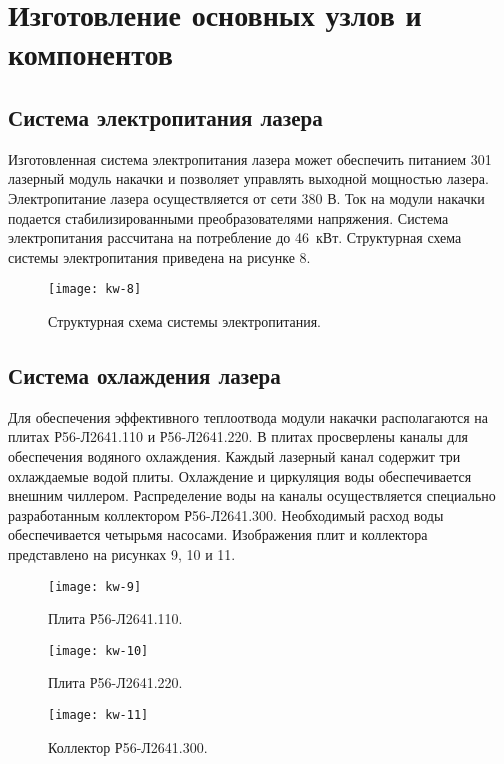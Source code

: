 \section{Изготовление основных узлов и компонентов}
\label{sec:kw-manufacturing}

\subsection{Система электропитания лазера}

Изготовленная система электропитания лазера может обеспечить питанием 301 лазерный модуль накачки и позволяет управлять выходной мощностью лазера. Электропитание лазера осуществляется от сети 380 В. Ток на модули накачки подается стабилизированными преобразователями напряжения. Система электропитания рассчитана на потребление до 46~кВт. Структурная схема системы электропитания приведена на рисунке 8.
\begin{figure}
  \centering
  \texttt{[image: kw-8]}
  \caption{Структурная схема системы электропитания.}
  \label{img:kw-8}
\end{figure}

\subsection{Система охлаждения лазера}

Для обеспечения эффективного теплоотвода модули накачки располагаются на плитах Р56-Л2641.110 и Р56-Л2641.220. В плитах просверлены каналы для обеспечения водяного охлаждения. Каждый лазерный канал содержит три охлаждаемые водой плиты. Охлаждение и циркуляция воды обеспечивается внешним чиллером. Распределение воды на каналы осуществляется специально разработанным коллектором Р56-Л2641.300. Необходимый расход воды обеспечивается четырьмя насосами. Изображения плит и коллектора представлено на рисунках 9, 10 и 11.
\begin{figure}
  \centering
  \texttt{[image: kw-9]}
  \caption{Плита Р56-Л2641.110.}
  \label{img:kw-9}
\end{figure}
\begin{figure}
  \centering
  \texttt{[image: kw-10]}
  \caption{Плита Р56-Л2641.220.}
  \label{img:kw-10}
\end{figure}
\begin{figure}
  \centering
  \texttt{[image: kw-11]}
  \caption{Коллектор Р56-Л2641.300.}
  \label{img:kw-11}
\end{figure}


